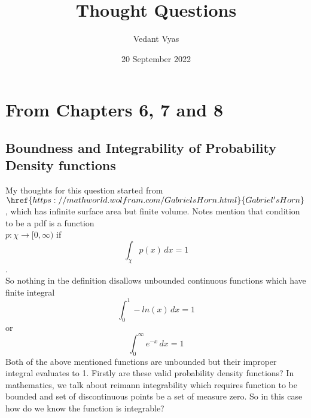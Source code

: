 \documentclass{article}
\title{Thought Questions}
\author{Vedant Vyas}
\date{20 September 2022}
\begin{document}
\maketitle

\section{From Chapters 6, 7 and 8}

\subsection{Boundness and Integrability of Probability Density
functions} 

My thoughts for this question started from $\href{https://mathworld.wolfram.com/GabrielsHorn.html}{Gabriel's Horn}$ , which has infinite surface area but finite volume.  Notes mention that condition to be a pdf is a function \\$p:\chi \to [0, \infty)$ if \\ \[ \int_{\chi}^{} p(x) \,dx  = 1\].\\So nothing in the definition disallows unbounded continuous functions which have finite integral
\[ \int_{0}^{1} -ln(x) \,dx  = 1\] or \[ \int_{0}^{\infty} e^{-x} \,dx  = 1\] Both of the above mentioned functions are unbounded but their improper integral evaluates to 1. Firstly are these valid probability density functions? 
In mathematics, we talk about reimann integrability which requires function to be bounded and set of discontinuous points be a set of measure zero. So in this case how do we know the function is integrable?


\\\\
\end{document}
